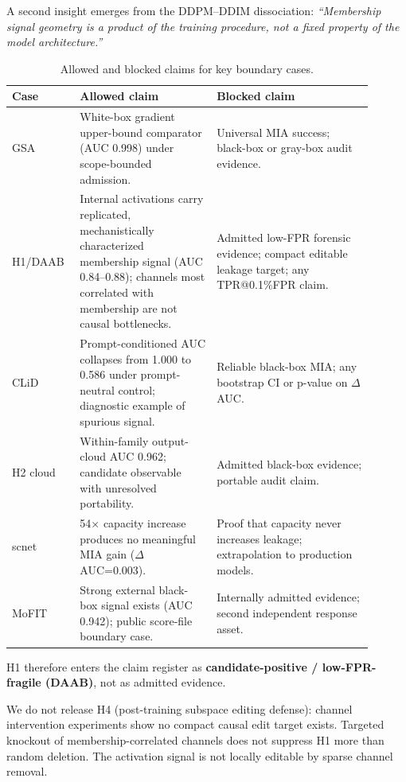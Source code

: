 \documentclass[10pt,conference]{IEEEtran}
\begin{document}
A second insight emerges from the DDPM--DDIM dissociation:
\textit{``Membership signal geometry is a product of the training procedure,
not a fixed property of the model architecture.''}

\begin{table}[t]
\centering
\caption{Allowed and blocked claims for key boundary cases.}
\label{tab:allowed-blocked}
\scriptsize
\setlength{\tabcolsep}{3pt}
\begin{tabular}{@{}L{0.15\linewidth}L{0.35\linewidth}L{0.40\linewidth}@{}}
\toprule
Case & Allowed claim & Blocked claim \\
\midrule
GSA & White-box gradient upper-bound comparator (AUC 0.998) under scope-bounded admission. & Universal MIA success; black-box or gray-box audit evidence. \\
H1/DAAB & Internal activations carry replicated, mechanistically characterized membership signal (AUC 0.84--0.88); channels most correlated with membership are not causal bottlenecks. & Admitted low-FPR forensic evidence; compact editable leakage target; any TPR@0.1\%FPR claim. \\
CLiD & Prompt-conditioned AUC collapses from 1.000 to 0.586 under prompt-neutral control; diagnostic example of spurious signal. & Reliable black-box MIA; any bootstrap CI or p-value on $\Delta$AUC. \\
H2 cloud & Within-family output-cloud AUC 0.962; candidate observable with unresolved portability. & Admitted black-box evidence; portable audit claim. \\
scnet & 54$\times$ capacity increase produces no meaningful MIA gain ($\Delta$AUC{=}0.003). & Proof that capacity never increases leakage; extrapolation to production models. \\
MoFIT & Strong external black-box signal exists (AUC 0.942); public score-file boundary case. & Internally admitted evidence; second independent response asset. \\
\bottomrule
\end{tabular}
\end{table}

H1 therefore enters the claim register as \textbf{candidate-positive /
low-FPR-fragile (DAAB)}, not as admitted evidence.

We do not release H4 (post-training subspace editing defense): channel
intervention experiments show no compact causal edit target exists.
Targeted knockout of membership-correlated channels does not suppress
H1 more than random deletion. The activation signal is not locally
editable by sparse channel removal.
\end{document}
